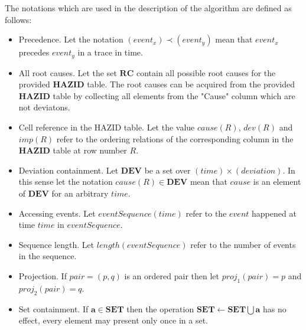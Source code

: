 \documentclass[conference]{IEEEtran}
\begin{document}
The notations which are used in the description of the algorithm are defined as follows:

\begin{itemize}
\item Precedence. Let the notation $(event_x) \prec (event_y)$ mean that $event_x$ precedes $event_y$ in a trace in time.
\item All root causes. Let the set $\mathbf{RC}$ contain all possible root causes for the provided $\mathbf{HAZID}$ table. The root causes can be acquired from the provided $\mathbf{HAZID}$ table by collecting all elements from the "Cause" column which are not deviatons.
\item Cell reference in the HAZID table. Let the value $cause(R)$, $dev(R)$ and $imp(R)$ refer to the ordering relations of the corresponding column
in the $\mathbf{HAZID}$ table at row number $R$.
\item Deviation containment. Let $\mathbf{DEV}$ be a set over $(time)\times(deviation)$. In this sense let the notation $cause(R) \in \mathbf{DEV}$ mean that $cause$ is an element of $\mathbf{DEV}$ for an arbitrary $time$.
\item Accessing events. Let $eventSequence(time)$ refer to the $event$ happened at time $time$ in $eventSequence$.
\item Sequence length. Let $length(eventSequence)$ refer to the number of events in the sequence.
\item Projection. If $pair = (p,q)$ is an ordered pair then let $proj_1(pair)=p$ and $proj_2(pair)=q$.
\item Set containment. If $\mathbf{a} \in \mathbf{SET}$ then the operation $\mathbf{SET} \leftarrow \mathbf{SET} \bigcup \mathbf{a}$ has no effect, every element may present only once in a set.
\end{itemize}
\end{document}
